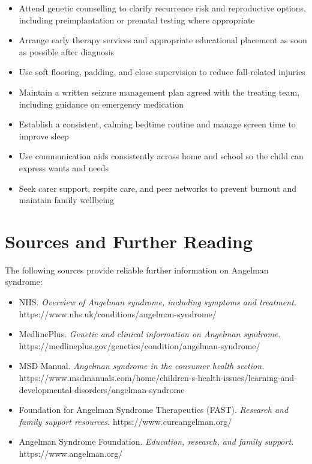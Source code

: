 \begin{itemize}
    \item Attend genetic counselling to clarify recurrence risk and reproductive options, including preimplantation or prenatal testing where appropriate
    \item Arrange early therapy services and appropriate educational placement as soon as possible after diagnosis
    \item Use soft flooring, padding, and close supervision to reduce fall-related injuries
    \item Maintain a written seizure management plan agreed with the treating team, including guidance on emergency medication
    \item Establish a consistent, calming bedtime routine and manage screen time to improve sleep
    \item Use communication aids consistently across home and school so the child can express wants and needs
    \item Seek carer support, respite care, and peer networks to prevent burnout and maintain family wellbeing
\end{itemize}

\section*{Sources and Further Reading}
The following sources provide reliable further information on Angelman syndrome:

\begin{itemize}
    \item NHS. \textit{Overview of Angelman syndrome, including symptoms and treatment.} https://www.nhs.uk/conditions/angelman-syndrome/
    \item MedlinePlus. \textit{Genetic and clinical information on Angelman syndrome.} https://medlineplus.gov/genetics/condition/angelman-syndrome/
    \item MSD Manual. \textit{Angelman syndrome in the consumer health section.} https://www.msdmanuals.com/home/children-s-health-issues/learning-and-developmental-disorders/angelman-syndrome
    \item Foundation for Angelman Syndrome Therapeutics (FAST). \textit{Research and family support resources.} https://www.cureangelman.org/
    \item Angelman Syndrome Foundation. \textit{Education, research, and family support.} https://www.angelman.org/
\end{itemize}
